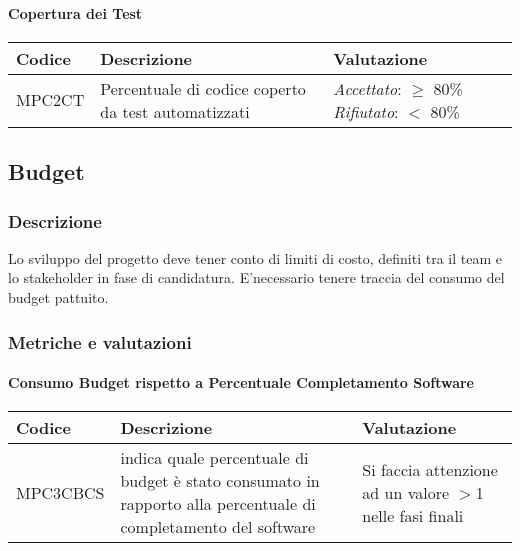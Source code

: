 \paragraph{Copertura dei Test}

\begin{table}[h]
\centering
\begin{tabular}{ |>{\centering\arraybackslash}m{3cm}|>{\centering\arraybackslash}m{10cm}|>{\centering\arraybackslash}m{3cm}| }
\hline
Codice & Descrizione & Valutazione\\
\hline
MPC2CT & Percentuale di codice coperto da test automatizzati &
\textit{Accettato}: $\geq$ 80\%
\textit{Rifiutato}: $<$ 80\%\\
\hline
\end{tabular}
\end{table}

\subsection{Budget}
\subsubsection{Descrizione}
Lo sviluppo del progetto deve tener conto di limiti di costo, definiti tra il team e lo stakeholder in fase di candidatura. E'necessario tenere traccia del consumo del budget pattuito.

\subsubsection{Metriche e valutazioni}
\paragraph{Consumo Budget rispetto a Percentuale Completamento Software}

\begin{table}[h]
\centering
\begin{tabular}{ |>{\centering\arraybackslash}m{3cm}|>{\centering\arraybackslash}m{10cm}|>{\centering\arraybackslash}m{3cm}| }
\hline
Codice & Descrizione & Valutazione\\
\hline
MPC3CBCS & indica quale percentuale di budget è stato consumato in rapporto alla percentuale di completamento del software & Si faccia attenzione ad un valore $>$1 nelle fasi finali\\
\hline
\end{tabular}
\end{table}

